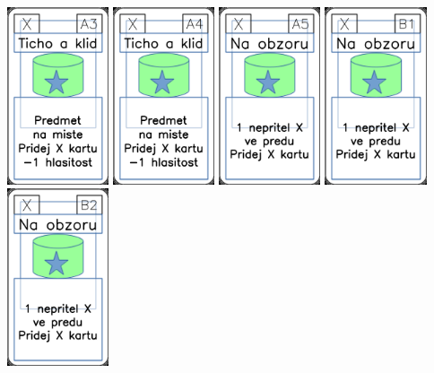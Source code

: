 \documentclass[a4paper]{article}
\begin{document}
	\includegraphics[width=3.0cm]{img-5_2}
	\includegraphics[width=3.0cm]{img-5_3}
	\includegraphics[width=3.0cm]{img-5_4}
	\includegraphics[width=3.0cm]{img-5_5}
	\includegraphics[width=3.0cm]{img-5_6}
\end{document}
